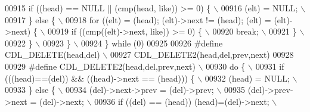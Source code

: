 \begin{DoxyCode}
00915 \textcolor{preprocessor}{  if ((head) == NULL || (cmp(head, like)) >= 0) \{                                              \(\backslash\)}
00916 \textcolor{preprocessor}{    (elt) = NULL;                                                                              \(\backslash\)}
00917 \textcolor{preprocessor}{  \} else \{                                                                                     \(\backslash\)}
00918 \textcolor{preprocessor}{    for ((elt) = (head); (elt)->next != (head); (elt) = (elt)->next) \{                         \(\backslash\)}
00919 \textcolor{preprocessor}{      if ((cmp((elt)->next, like)) >= 0) \{                                                     \(\backslash\)}
00920 \textcolor{preprocessor}{        break;                                                                                 \(\backslash\)}
00921 \textcolor{preprocessor}{      \}                                                                                        \(\backslash\)}
00922 \textcolor{preprocessor}{    \}                                                                                          \(\backslash\)}
00923 \textcolor{preprocessor}{  \}                                                                                            \(\backslash\)}
00924 \textcolor{preprocessor}{\} while (0)}
00925 
00926 \textcolor{preprocessor}{#define CDL\_DELETE(head,del)                                                                   \(\backslash\)}
00927 \textcolor{preprocessor}{    CDL\_DELETE2(head,del,prev,next)}
00928 
00929 \textcolor{preprocessor}{#define CDL\_DELETE2(head,del,prev,next)                                                        \(\backslash\)}
00930 \textcolor{preprocessor}{do \{                                                                                           \(\backslash\)}
00931 \textcolor{preprocessor}{  if (((head)==(del)) && ((head)->next == (head))) \{                                           \(\backslash\)}
00932 \textcolor{preprocessor}{      (head) = NULL;                                                                           \(\backslash\)}
00933 \textcolor{preprocessor}{  \} else \{                                                                                     \(\backslash\)}
00934 \textcolor{preprocessor}{     (del)->next->prev = (del)->prev;                                                          \(\backslash\)}
00935 \textcolor{preprocessor}{     (del)->prev->next = (del)->next;                                                          \(\backslash\)}
00936 \textcolor{preprocessor}{     if ((del) == (head)) (head)=(del)->next;                                                  \(\backslash\)}

\end{DoxyCode}
